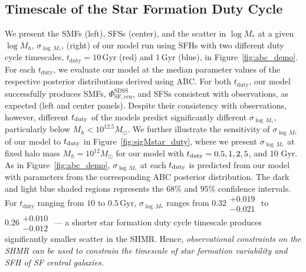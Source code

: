 \documentclass[12pt, letterpaper, preprint, tighten]{aastex62}
\newcommand{\ch}[1]{\color{orange}{\bf CH:} #1}
\begin{document}
\subsection{Timescale of the Star Formation Duty Cycle} \label{sec:sfdutycycle}
We present the SMFs (left), SFSs (center), and the scatter in $\log M_*$ at a 
given $\log M_h$, $\sigma_{\log\,M_*}$, (right) of our model run using SFHs with 
two different duty cycle timescales, $t_\mathrm{duty} = 10\,\mathrm{Gyr}$ (red) 
and $1\,\mathrm{Gyr}$ (blue), in Figure~\ref{fig:abc_demo}. For each 
$t_\mathrm{duty}$, we evaluate our model at the median parameter values of the respective posterior distributions derived 
using ABC. For both $t_\mathrm{duty}$, our model successfully produces SMFs, 
$\Phi^\mathrm{SDSS}_\mathrm{SF,cen}$, and SFSs consistent with observations, 
as expected (left and center panels). Despite their consistency with observations, 
however, different $t_{\rm duty}$ of the models predict significantly different 
$\sigma_{\log\,M_*}$, particularly below $M_h < 10^{12.5}M_\odot$. We further
illustrate the sensitivity of $\sigma_{\log\,M_*}$ of our model to $t_{\rm duty}$
in Figure~\ref{fig:sigMstar_duty}, where we present $\sigma_{\log\,M_*}$ at
fixed halo mass $M_h = 10^{12} M_\odot$ for our model with $t_{\rm duty} = 0.5, 1, 2, 5$, 
and $10$ Gyr. As in Figure~\ref{fig:abc_demo}, $\sigma_{\log\,M_*}$ at each $t_{\rm duty}$ 
is predicted from our model with parameters from the corresponding ABC posterior 
distribution. The dark and light blue shaded regions represents the $68\%$ and $95\%$ 
confidence intervals. For $t_\mathrm{duty}$ ranging from $10$ to $0.5\,\mathrm{Gyr}$,
$\sigma_{\log\,M_*}$ ranges from 
{\ch $0.32\substack{+0.019\\ -0.021}$ to $0.26\substack{+0.010\\-0.012}$}
--- a shorter star formation duty cycle timescale produces significantly 
smaller scatter in the SHMR. Hence, \emph{observational constraints on 
the SHMR can be used to constrain the timescale of star formation variability 
and SFH of SF central galaxies.} 
\end{document}
